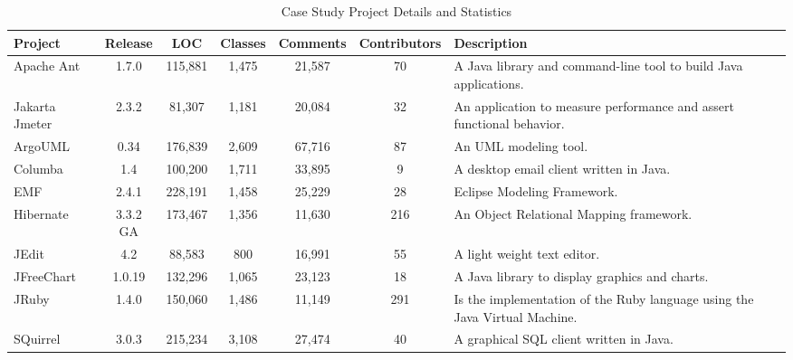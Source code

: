 \begin{table*}[!tbh]
    \begin{center}
        \caption{Case Study Project Details and Statistics}
        \vspace{-2mm}
        \label{tab:projDetails}
        \begin{tabular}{l| c c c c c | p{2.5in}}
            \toprule
            \textbf{Project} & \textbf{Release} & \textbf{LOC} & \textbf{Classes} & \textbf{Comments} & \textbf{Contributors} & \textbf{Description}                                                      
            \\ \midrule
            Apache Ant       & 1.7.0            & 115,881      & 1,475            & 21,587            & 70                    & A Java library and command-line tool to build Java applications.           \\
            Jakarta Jmeter   & 2.3.2            & 81,307       & 1,181            & 20,084            & 32                    & An application to measure performance and assert functional behavior.      \\
            ArgoUML          & 0.34             & 176,839      & 2,609            & 67,716            & 87                    & An UML modeling tool.                                                      \\
            Columba          & 1.4              & 100,200      & 1,711            & 33,895            & 9                     & A desktop email client written in Java.                                    \\
            EMF              & 2.4.1            & 228,191      & 1,458            & 25,229            & 28                    & Eclipse Modeling Framework.                                                \\
            Hibernate        & 3.3.2 GA         & 173,467      & 1,356            & 11,630            & 216                   & An Object Relational Mapping framework.                                    \\
            JEdit            & 4.2              & 88,583       & 800              & 16,991            & 55                    & A light weight text editor.                                                \\
            JFreeChart       & 1.0.19           & 132,296      & 1,065            & 23,123            & 18                    & A Java library to display graphics and charts.                             \\
            JRuby            & 1.4.0            & 150,060      & 1,486            & 11,149            & 291                   & Is the implementation of the Ruby language using the Java Virtual Machine. \\
            SQuirrel         & 3.0.3            & 215,234      & 3,108            & 27,474            & 40                    & A graphical SQL client written in Java.                                    
            \\ \bottomrule
        \end{tabular}
    \end{center}
\end{table*}

